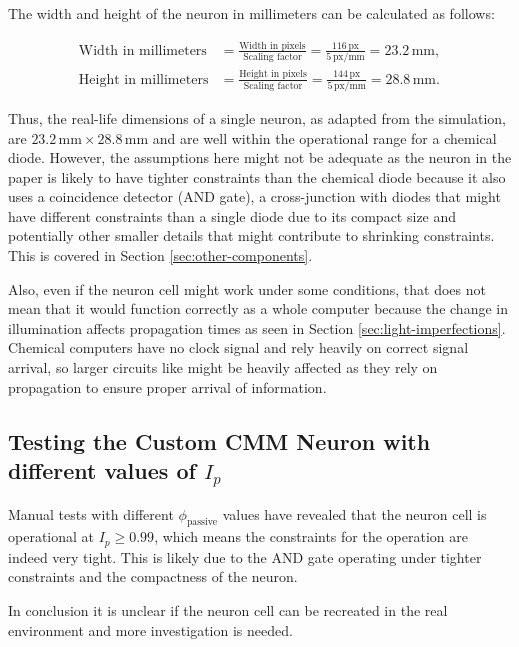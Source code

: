 The width and height of the neuron in millimeters can be calculated as follows:

\begin{align*}
\text{Width in millimeters} &= \frac{\text{Width in pixels}}{\text{Scaling factor}} = \frac{116 \, \text{px}}{5 \, \text{px/mm}} = 23.2 \, \text{mm}, \\
\text{Height in millimeters} &= \frac{\text{Height in pixels}}{\text{Scaling factor}} = \frac{144 \, \text{px}}{5 \, \text{px/mm}} = 28.8 \, \text{mm}.
\end{align*}

Thus, the real-life dimensions of a single neuron, as adapted from the simulation, are $23.2 \, \text{mm} \times 28.8 \, \text{mm}$ and are well within the operational range for a chemical diode. 
However, the assumptions here might not be adequate as the neuron in the paper is likely to have tighter constraints than the chemical diode because it also uses a coincidence detector (AND gate),
a cross-junction with diodes that might have different constraints than a single diode due to its compact size and potentially other smaller details that might contribute to 
shrinking constraints. This is covered in Section \ref{sec:other-components}.



Also, even if the neuron cell might work under some conditions, that does not mean that it would function correctly as a whole computer because 
the change in illumination affects propagation times \citep{reddy1995effect} as seen in Section \ref{sec:light-imperfections}.
Chemical computers have no clock signal and rely heavily on correct signal arrival, so larger circuits like \cite{StovoldJames2019RaGI} 
might be heavily affected as they rely on propagation to ensure proper arrival of information.

\subsection{Testing the Custom CMM Neuron with different values of $I_p$}\label{sec:testing-neuron}
Manual tests with different $\phi_{\text{passive}}$ values have revealed that the neuron cell is operational at \( I_p \geq 0.99 \), which means the constraints for the operation are indeed very tight.
This is likely due to the AND gate operating under tighter constraints and the compactness of the neuron. 

In conclusion it is unclear if the neuron cell can be recreated in the real environment and more investigation is needed.

